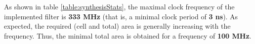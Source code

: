 As shown in table \ref{table:synthesisStats}, the maximal clock frequency of the implemented filter is \textbf{333 MHz} (that is, a minimal clock period of \textbf{3 ns}). As expected, the required (cell and total) area is generally increasing with the frequency. Thus, the minimal total area is obtained for a frequency of \textbf{100 MHz}.
